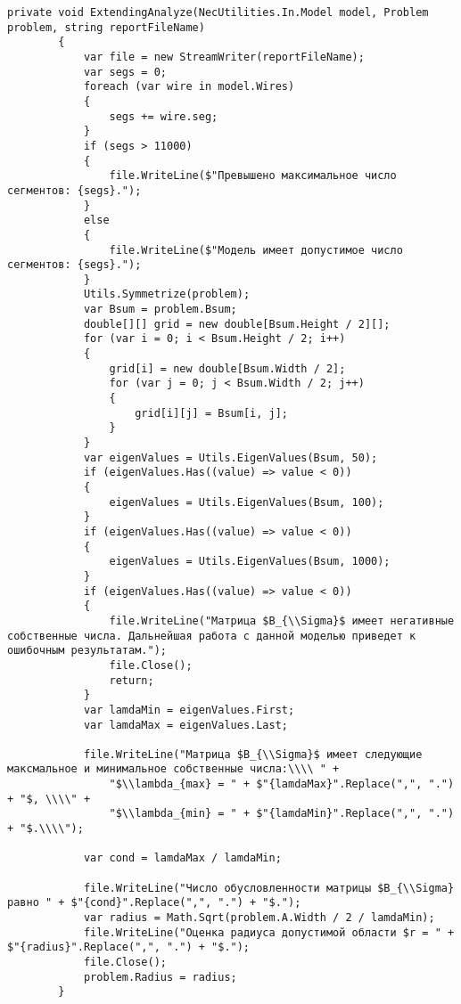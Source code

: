 \documentclass{scrartcl}
\begin{document}
\begin{lstlisting}[language={[Sharp]C}, caption={Experiment}, label={experiment}]
        private void ExtendingAnalyze(NecUtilities.In.Model model, Problem problem, string reportFileName)
        {
            var file = new StreamWriter(reportFileName);
            var segs = 0;
            foreach (var wire in model.Wires)
            {
                segs += wire.seg;
            }
            if (segs > 11000)
            {
                file.WriteLine($"Превышено максимальное число сегментов: {segs}.");
            }
            else
            {
                file.WriteLine($"Модель имеет допустимое число сегментов: {segs}.");
            }
            Utils.Symmetrize(problem);
            var Bsum = problem.Bsum;
            double[][] grid = new double[Bsum.Height / 2][];
            for (var i = 0; i < Bsum.Height / 2; i++)
            {
                grid[i] = new double[Bsum.Width / 2];
                for (var j = 0; j < Bsum.Width / 2; j++)
                {
                    grid[i][j] = Bsum[i, j];
                }
            }
            var eigenValues = Utils.EigenValues(Bsum, 50);
            if (eigenValues.Has((value) => value < 0))
            {
                eigenValues = Utils.EigenValues(Bsum, 100);
            }
            if (eigenValues.Has((value) => value < 0))
            {
                eigenValues = Utils.EigenValues(Bsum, 1000);
            }
            if (eigenValues.Has((value) => value < 0))
            {
                file.WriteLine("Матрица $B_{\\Sigma}$ имеет негативные собственные числа. Дальнейшая работа с данной моделью приведет к ошибочным результатам.");
                file.Close();
                return;
            }
            var lamdaMin = eigenValues.First;
            var lamdaMax = eigenValues.Last;

            file.WriteLine("Матрица $B_{\\Sigma}$ имеет следующие максмальное и минимальное собственные числа:\\\\ " +
                "$\\lambda_{max} = " + $"{lamdaMax}".Replace(",", ".") + "$, \\\\" +
                "$\\lambda_{min} = " + $"{lamdaMin}".Replace(",", ".") + "$.\\\\");

            var cond = lamdaMax / lamdaMin;

            file.WriteLine("Число обусловленности матрицы $B_{\\Sigma} равно " + $"{cond}".Replace(",", ".") + "$.");
            var radius = Math.Sqrt(problem.A.Width / 2 / lamdaMin);
            file.WriteLine("Оценка радиуса допустимой области $r = " + $"{radius}".Replace(",", ".") + "$.");
            file.Close();
            problem.Radius = radius;
        }


\end{lstlisting}
\end{document}
